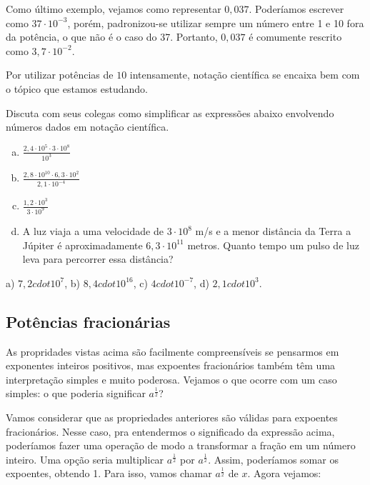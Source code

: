 \documentclass[main_estudante.tex]{subfiles}
\begin{document}
Como último exemplo, vejamos como representar $0,037$. Poderíamos escrever como $37 \cdot 10^{-3}$, porém, padronizou-se utilizar sempre um número entre 1 e 10 fora da potência, o que não é o caso do 37. Portanto, $0,037$ é comumente rescrito como $3,7 \cdot 10^{-2}$.

Por utilizar potências de $10$ intensamente, notação científica se encaixa bem com o tópico que estamos estudando.

\begin{questao}
Discuta com seus colegas como simplificar as expressões abaixo envolvendo números dados em notação científica.
\begin{enumerate}[a)]
\item $\frac{2,4  \cdot 10^5 \cdot 3  \cdot 10^8}{10^3}$
\item $\frac{2,8  \cdot 10^{10} \cdot 6,3  \cdot 10^2}{2,1 \cdot 10^{-4}}$
\item $\frac{1,2  \cdot 10^3}{3 \cdot 10^9}$
\item A luz viaja a uma velocidade de $3 \cdot 10^8$ m/s e a menor distância da Terra a Júpiter é aproximadamente $6,3 \cdot 10^{11}$ metros. Quanto tempo um pulso de luz leva para percorrer essa distância?
\end{enumerate}
\end{questao}

\begin{gabarito}
	\begin{gabaritoQuestao}
		a) $7,2 cdot 10^{7}$, b) $8,4 cdot 10^{16}$, c) $4 cdot 10^{-7}$, d) $2,1 cdot 10^{3}$.
	\end{gabaritoQuestao}
\end{gabarito}

\subsection*{Potências fracionárias}

As propridades vistas acima são facilmente compreensíveis se pensarmos em exponentes inteiros positivos, mas expoentes fracionários também têm uma interpretação simples e muito poderosa. Vejamos o que ocorre com um caso simples: o que poderia significar $a^\frac{1}{2}$? 

Vamos considerar que as propriedades anteriores são válidas para expoentes fracionários. Nesse caso, pra entendermos o significado da expressão acima, poderíamos fazer uma operação de modo a transformar a fração em um número inteiro. Uma opção seria multiplicar $a^\frac{1}{2}$ por $a^\frac{1}{2}$. Assim, poderíamos somar os expoentes, obtendo 1. Para isso, vamos chamar $a^\frac{1}{2}$ de $x$. Agora vejamos:
\end{document}
